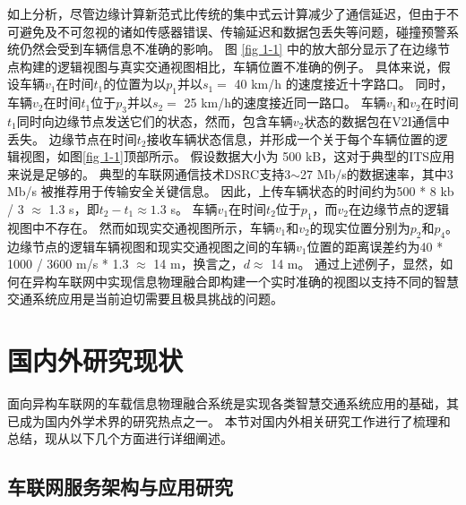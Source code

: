 如上分析，尽管边缘计算新范式比传统的集中式云计算减少了通信延迟，但由于不可避免及不可忽视的诸如传感器错误、传输延迟和数据包丢失等问题，碰撞预警系统仍然会受到车辆信息不准确的影响。
图 \ref{fig 1-1} 中的放大部分显示了在边缘节点构建的逻辑视图与真实交通视图相比，车辆位置不准确的例子。
具体来说，假设车辆$v_1$在时间$t_1$的位置为以$p_1$并以$s_1 =$ 40 km/h 的速度接近十字路口。
同时，车辆$v_2$在时间$t_1$位于$p_3$并以$s_2=$ 25 km/h的速度接近同一路口。
车辆$v_1$和$v_2$在时间$t_1$同时向边缘节点发送它们的状态，然而，包含车辆$v_2$状态的数据包在V2I通信中丢失。
边缘节点在时间$t_2$接收车辆状态信息，并形成一个关于每个车辆位置的逻辑视图，如图\ref{fig 1-1}顶部所示。
假设数据大小为 500 kB，这对于典型的ITS应用来说是足够的\cite{liu2013improving}。
典型的车联网通信技术DSRC支持3$\sim$27 Mb/s的数据速率，其中3 Mb/s 被推荐用于传输安全关键信息\cite{kenney2011dedicated}。
因此，上传车辆状态的时间约为500 * 8 kb / 3 $\approx$ 1.3 s，即${t_2} - {t_1} \approx 1.3$ s。
车辆$v_1$在时间$t_2$位于$p_1$，而$v_2$在边缘节点的逻辑视图中不存在。
然而如现实交通视图所示，车辆$v_1$和$v_2$的现实位置分别为$p_2$和$p_4$。
边缘节点的逻辑车辆视图和现实交通视图之间的车辆$v_1$位置的距离误差约为40 * 1000 / 3600 m/s * 1.3 $\approx$ 14 m，换言之，$d \approx$ 14 m。
通过上述例子，显然，如何在异构车联网中实现信息物理融合即构建一个实时准确的视图以支持不同的智慧交通系统应用是当前迫切需要且极具挑战的问题。

\section{国内外研究现状}\label{section 1-3}

面向异构车联网的车载信息物理融合系统是实现各类智慧交通系统应用的基础，其已成为国内外学术界的研究热点之一。
本节对国内外相关研究工作进行了梳理和总结，现从以下几个方面进行详细阐述。

\subsection{车联网服务架构与应用研究}

